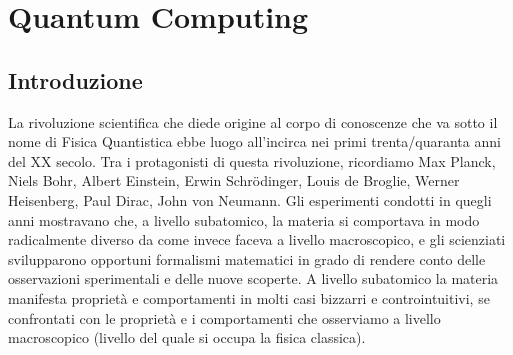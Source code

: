 \chapter{Quantum Computing}

\section{Introduzione}

La rivoluzione scientifica che diede origine al corpo di conoscenze
che va sotto il nome di Fisica Quantistica ebbe luogo all’incirca nei
primi trenta/quaranta anni del XX secolo. Tra i protagonisti di questa rivoluzione, ricordiamo Max Planck,
Niels Bohr, Albert Einstein, Erwin Schr\"odinger, Louis de Broglie,
Werner Heisenberg, Paul Dirac, John von Neumann. Gli esperimenti condotti in quegli anni mostravano che, a livello
subatomico, la materia si comportava in modo radicalmente diverso
da come invece faceva a livello macroscopico, e gli scienziati
svilupparono opportuni formalismi matematici in grado di rendere
conto delle osservazioni sperimentali e delle nuove scoperte. A livello subatomico la materia manifesta proprietà e comportamenti
in molti casi bizzarri e controintuitivi, se confrontati con le proprietà
e i comportamenti che osserviamo a livello macroscopico (livello del
quale si occupa la fisica classica). 




